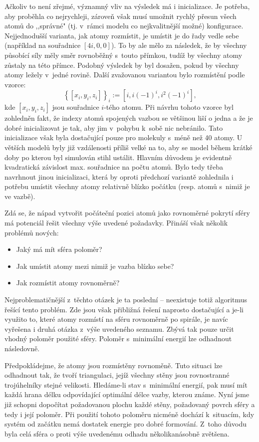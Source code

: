 Ačkoliv to není zřejmé, významný vliv na výsledek má i inicializace. Je potřeba,
aby proběhla co nejrychleji, zároveň však musí umožnit rychlý přesun všech atomů
do ,,správné" (tj. v~rámci modelu co nejkvalitnější mož\-né) konfigurace.
Nejjednodušší varianta, jak atomy rozmístit, je umístit je do řady vedle sebe
(například na souřadnice $\left[4i, 0, 0\right]$). To by ale mělo za následek,
že by všechny působící síly měly směr rovnoběžný s~touto přímkou, tudíž by
všechny atomy zůstaly na této přímce. Podobný výsledek by byl dosažen, pokud by
všechny atomy ležely v~jedné rovině. Další zvažovanou variantou bylo rozmístění
podle vzorce:
$$	\left\{\left[x_i, y_i, z_i\right]\right\}_i :=
	\left[ i, i\left(-1\right)^i, i^2\left(-1\right)^i\right],$$
kde $\left[x_i, y_i, z_i\right]$ jsou souřadnice $i$-tého atomu. Při návrhu
tohoto vzorce byl zohledněn fakt, že indexy atomů spojených vazbou se většinou
liší o jedna a že je dobré inicializovat je tak, aby jim v~pohybu k~sobě nic
nebránilo. Tato inicializace však byla dostačující pouze pro molekuly s~méně než
40 atomy. U větších modelů byly již vzdálenosti příliš velké na to, aby se model
během krátké doby po kterou byl simulován stihl ustálit. Hlavním důvodem je
evidentně kvadratická závislost max. souřadnice na počtu atomů. Bylo tedy třeba
navrhnout jinou inicializaci, která by oproti předchozí variantě zohlednila i
potřebu umístit všechny atomy relativně blízko počátku (resp. atomů s~nimiž je
ve vazbě).

Zdá se, že nápad vytvořit počáteční pozici atomů jako rovnoměrné pokrytí sféry
má potenciál řešit všechny výše uvedené požadavky. Přináší však ně\-ko\-lik problémů
nových:
\begin{itemize}
	\item Jaký má mít sféra poloměr?
	\item Jak umístit atomy mezi nimiž je vazba blízko sebe?
	\item Jak rozmístit atomy rovnoměrně?
\end{itemize}

Nejproblematičnější z~těchto otázek je ta poslední -- neexistuje totiž algoritmus
řešící tento problém. Zde jsou však přibližná řešení naprosto do\-sta\-ču\-jí\-cí a
je-li využito to, které atomy rozmístí na sféru rovnoměrně po spirále, je navíc
vyřešena i druhá otázka z~výše uvedeného seznamu.\cite{Saff:koule} Zbývá tak
pouze určit vhodný poloměr použité sféry. Poloměr s~minimální energií lze
odhadnout následovně.

Předpokládejme, že atomy jsou rozmístěny rovnoměně. Tuto situaci lze odhadnout tak,
že tvoří triangulaci, jejíž všechny stěny jsou rovnostranné trojúhelníky stejné
velikosti. Hledáme-li stav s~minimální energií, pak musí mít každá hrana délku
odpovídající optimální délce vazby, kterou známe. Nyní jsme již schopni dopočítat
požadovanou plochu každé stěny, požadovaný povrch sféry a tedy i její poloměr.
Při použití tohoto poloměru nicméně dochází k~situacím, kdy systém od začátku nemá
dostatek energie pro dobré formování. Z~toho důvodu byla celá sféra o proti výše
uvedenému odhadu několikanásobně zvětšena.

